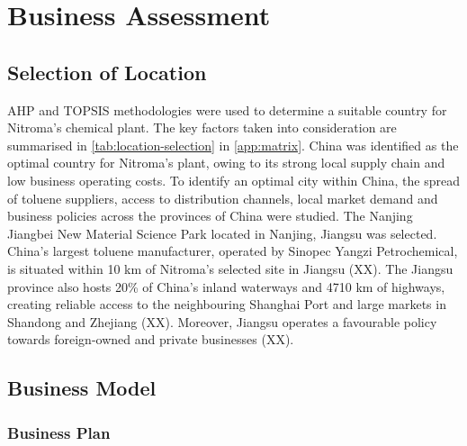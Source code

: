 \section{Business Assessment}
\label{sec:economics}
\subsection{Selection of Location} 
AHP and TOPSIS methodologies were used to determine a suitable country for Nitroma’s chemical plant. The key factors taken into consideration are summarised in \cref{tab:location-selection} in \cref{app:matrix}. China was identified as the optimal country for Nitroma's plant, owing to its strong local supply chain and low business operating costs. To identify an optimal city within China, the spread of toluene suppliers, access to distribution channels, local market demand and business policies across the provinces of China were studied. The Nanjing Jiangbei New Material Science Park located in Nanjing, Jiangsu was selected. China’s largest toluene manufacturer, operated by Sinopec Yangzi Petrochemical, is situated within 10 km of Nitroma’s selected site in Jiangsu (XX). The Jiangsu province also hosts 20\% of China’s inland waterways and 4710 km of highways, creating reliable access to the neighbouring Shanghai Port and large markets in Shandong and Zhejiang (XX). Moreover, Jiangsu operates a favourable policy towards foreign-owned and private businesses (XX). 


\subsection{Business Model} 
\subsubsection{Business Plan}

